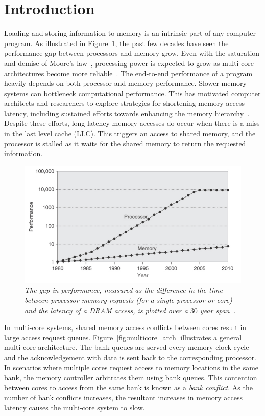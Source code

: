 \section{Introduction}
\label{sec:intro}
Loading and storing information to memory is an intrinsic part of any computer program. As illustrated in Figure~\ref{fig:cpuvsmemory}, the past few decades have seen the performance gap between processors and memory grow. Even with the saturation and demise of Moore's law~\cite{Wulf1995, waldrop2016, MooreMITR}, processing power is expected to grow as multi-core architectures become more reliable~\cite{Geer}. The end-to-end performance of a program heavily depends on both processor and memory performance. Slower memory systems can bottleneck computational performance. This has motivated computer architects and researchers to explore strategies for shortening memory access latency, including sustained efforts towards enhancing the memory hierarchy~\cite{Burger}. Despite these efforts, long-latency memory accesses do occur when there is a miss in the last level cache (LLC). This triggers an access to shared memory, and the processor is stalled as it waits for the shared memory to return the requested information.
\begin{figure}[t!]
\centering
\includegraphics[width=0.7\linewidth]{fig/cpuvsmemory.jpg}
\caption{\it{The gap in performance, measured as the difference in the time 
between processor memory requests (for a single processor or core) and the 
latency of a DRAM access, is plotted over a $30$ year span~\cite{comparchbook}.}}
\label{fig:cpuvsmemory}
\end{figure}
In multi-core systems, shared memory access conflicts between cores result in large access request queues. Figure~\ref{fig:multicore_arch}  illustrates a general multi-core architecture. The bank queues are served every memory clock cycle and the acknowledgement with data is sent back to the corresponding processor. In scenarios where multiple cores request access to memory locations in the same bank, the memory controller arbitrates them using bank queues. This contention between cores to access from the same bank is known as a {\em bank conflict}. As the number of bank conflicts increases, the resultant increases in memory access latency causes the multi-core system to slow.

